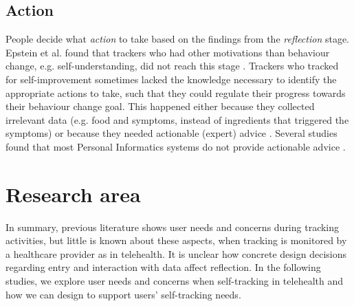 \subsection{Action} 
People decide what \textit{action} to take based on the findings from the \textit{reflection} stage. Epstein et al. found that trackers who had other motivations than behaviour change, e.g. self-understanding, did not reach this stage \cite{Epstein2015}. Trackers who tracked for self-improvement sometimes lacked the knowledge necessary to identify the appropriate actions to take, such that they could regulate their progress towards their behaviour change goal. This happened either because they collected irrelevant data \cite{Choe2014, Chung2015} (e.g. food and symptoms, instead of ingredients that triggered the symptoms) or because they needed actionable (expert) advice \cite{Verdezoto2015, Li2010, Oh2015}. Several studies found that most Personal Informatics systems do not provide actionable advice \cite{Chung2015, Li2010, Verdezoto2015}.

\section{Research area}
In summary, previous literature shows user needs and concerns during tracking activities, but little is known about these aspects, when tracking is monitored by a healthcare provider as in telehealth. It is unclear how concrete design decisions regarding entry and interaction with data affect reflection. In the following studies, we explore user needs and concerns when self-tracking in telehealth and how we can design to support users' self-tracking needs. 
